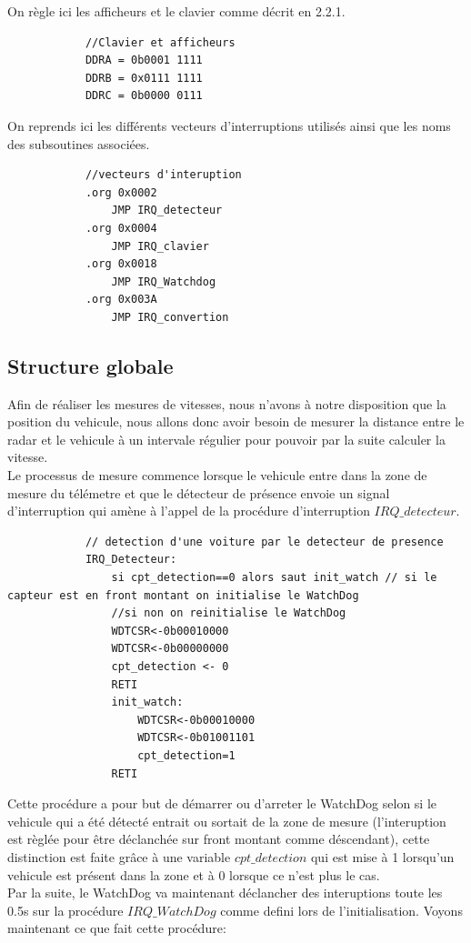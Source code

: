 \documentclass[a4paper, 12pt]{article}
\begin{document}
		On règle ici les afficheurs et le clavier comme décrit en 2.2.1.
		\begin{lstlisting}
			//Clavier et afficheurs
			DDRA = 0b0001 1111
			DDRB = 0x0111 1111
			DDRC = 0b0000 0111
		\end{lstlisting}
		\newpage
		On reprends ici les différents vecteurs d'interruptions utilisés ainsi que les noms des subsoutines associées.
		\begin{lstlisting}
			//vecteurs d'interuption
			.org 0x0002
				JMP IRQ_detecteur
			.org 0x0004
				JMP IRQ_clavier
			.org 0x0018
				JMP IRQ_Watchdog
			.org 0x003A
				JMP IRQ_convertion
		\end{lstlisting}
		\subsection{Structure globale}
		Afin de réaliser les mesures de vitesses, nous n'avons à notre disposition que la position du vehicule, nous allons donc avoir besoin de mesurer la distance entre le radar et le vehicule à un intervale régulier pour pouvoir par la suite calculer la vitesse. \\
		Le processus de mesure commence lorsque le vehicule entre dans la zone de mesure du télémetre et que le détecteur de présence envoie un signal d'interruption qui amène à l'appel de la procédure d'interruption $IRQ\_detecteur$.
		
		\begin{lstlisting}
			// detection d'une voiture par le detecteur de presence  
			IRQ_Detecteur:
				si cpt_detection==0 alors saut init_watch // si le capteur est en front montant on initialise le WatchDog
				//si non on reinitialise le WatchDog 
				WDTCSR<-0b00010000
				WDTCSR<-0b00000000
				cpt_detection <- 0 
				RETI
				init_watch: 
					WDTCSR<-0b00010000
					WDTCSR<-0b01001101
					cpt_detection=1
				RETI
		\end{lstlisting}
		Cette procédure a pour but de démarrer ou d'arreter le WatchDog selon si le vehicule qui a été détecté entrait ou sortait de la zone de mesure (l'interuption est règlée pour être déclanchée sur front montant comme déscendant), cette distinction est faite grâce à une variable $cpt\_detection$ qui est mise à 1 lorsqu'un vehicule est présent dans la zone et à 0 lorsque ce n'est plus le cas.\\
		
		Par la suite, le WatchDog va maintenant déclancher des interuptions toute les 0.5s sur la procédure $IRQ\_WatchDog$ comme defini lors de l'initialisation. Voyons maintenant ce que fait cette procédure:\\
		
\end{document}

